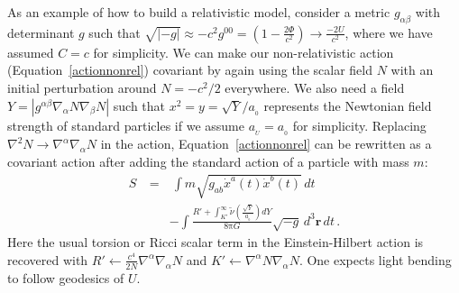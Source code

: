 \documentclass[fleqn,usenatbib,useAMS]{mnras} %
\begin{document}
As an example of how to build a relativistic model, consider a metric $g_{\alpha\beta}$ with determinant $g$ such that $\sqrt{\left| -g \right|} \approx -c^2 g^{00} = \left( 1 - \frac{2\Phi}{c^2} \right) \rightarrow \frac{-2U}{c^2}$, where we have assumed $C=c$ for simplicity. We can make our non-relativistic action (Equation~\ref{actionnonrel}) covariant by again using the scalar field $N$ with an initial perturbation around $N = -c^2/2$ everywhere. We also need a field $Y = \left| g^{\alpha\beta}\nabla_\alpha N \nabla_\beta N \right|$ such that $x^2 = y = \sqrt{Y}/a_{_0}$ represents the Newtonian field strength of standard particles if we assume $a_{_U} = a_{_0}$ for simplicity. Replacing $\nabla^2 N \rightarrow \nabla^\alpha \nabla_\alpha N$ in the action, Equation~\ref{actionnonrel} can be rewritten as a covariant action after adding the standard action of a particle with mass $m$:
\begin{eqnarray}
	S ~&=&~ \int  m\sqrt{g_{ab} \dot{x}^a(t) \dot{x}^b(t)} \, dt \nonumber \\
	&&-\int \frac{R' + \int^\infty_{K'} \widetilde{\nu}\left(\frac{\sqrt{Y}}{{a_{_0}}}\right)   dY}{8 \mathrm{\pi} G} \sqrt{-g} \, d^3 \bm{r} \, dt \, .
	\label{covLag}
\end{eqnarray}
Here the usual torsion or Ricci scalar term in the Einstein-Hilbert action is recovered with $R' \leftarrow \frac{c^4}{2N} \nabla^\alpha \nabla_\alpha N$ and $K' \leftarrow \nabla^\alpha N \nabla_\alpha N$.  One expects light bending to follow geodesics of $U$.

%
\end{document}
